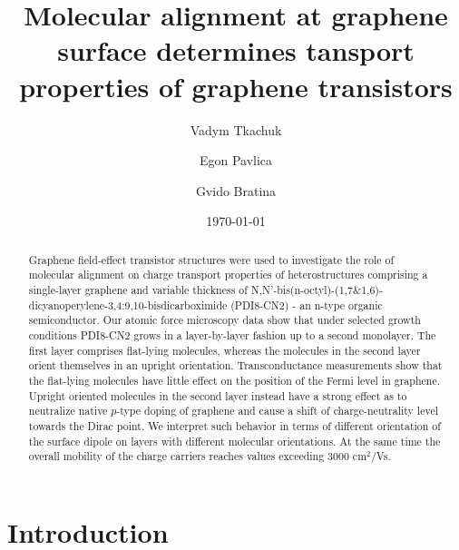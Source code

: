 \documentclass[preprint,aip,jap]{revtex4-2}
\begin{document}
\title{Molecular alignment at graphene surface determines tansport properties of graphene transistors}

\author{Vadym Tkachuk}%
\author{Egon Pavlica}%
\author{Gvido Bratina}%
%
\date{\today}

\begin{abstract}

  Graphene field-effect transistor structures were used to investigate the role of molecular alignment on charge transport properties of heterostructures comprising a single-layer graphene and variable thickness of N,N'-bis(n-octyl)-(1,7\&1,6)-dicyanoperylene-3,4:9,10-bisdicarboximide (PDI8-CN2) - an n-type organic semiconductor. Our atomic force microscopy data show that under selected growth conditions PDI8-CN2 grows in a layer-by-layer fashion up to a second monolayer. The first layer comprises flat-lying molecules, whereas the molecules in the second layer orient themselves in an upright orientation. Transconductance measurements show that the flat-lying molecules have little effect on the position of the Fermi level in graphene. Upright oriented molecules in the second layer instead have a strong effect as to neutralize native $p$-type doping of graphene and cause a shift of charge-neutrality level towards the Dirac point. We interpret such behavior in terms of different orientation of the surface dipole on layers with different molecular orientations. At the same time the overall mobility of the charge carriers reaches values exceeding 3000 cm$^{2}$/Vs.  
\end{abstract}


\maketitle

\section{\label{sec:intro}Introduction}
\end{document}
